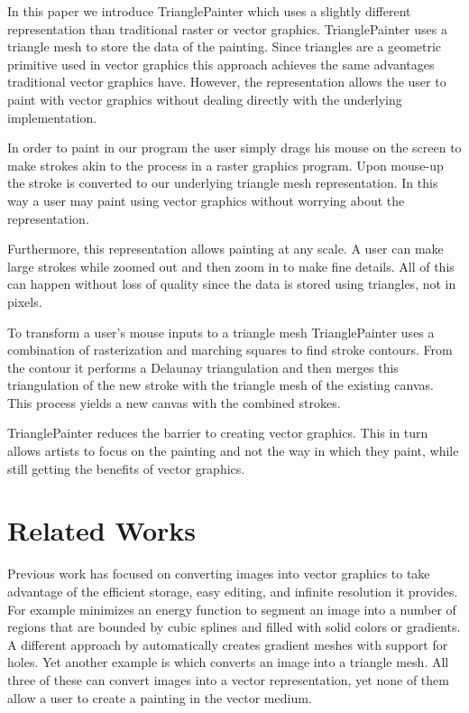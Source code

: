 \documentclass[review]{acmsiggraph}
\begin{document}
In this paper we introduce TrianglePainter which  
uses a slightly different representation than traditional raster or vector graphics.
TrianglePainter uses a triangle mesh to store the data of the painting.
Since triangles are a geometric primitive used in vector graphics this approach achieves the
same advantages traditional vector graphics have. However, the representation allows the
user to paint with vector graphics without dealing directly with the underlying implementation.

In order to paint in our program the user simply drags his mouse on the screen to make
strokes akin to the process in a raster graphics program. Upon mouse-up the stroke is
converted to our underlying triangle mesh representation. In this way a user may paint using
vector graphics without worrying about the representation.

Furthermore, this representation allows painting at any scale. A user can make large strokes
while zoomed out and then zoom in to make fine details. All of this can happen without
loss of quality since the data is stored using triangles, not in pixels.

To transform a user's mouse inputs to a triangle mesh
TrianglePainter uses a combination of rasterization and marching squares to
find stroke contours. From the contour it performs a Delaunay triangulation
and then merges this triangulation
of the new stroke with the triangle mesh of the existing canvas. This process yields
a new canvas with the combined strokes.

TrianglePainter reduces the barrier to creating vector graphics. This in turn allows 
artists to focus on the painting and not the way in which they paint, while still 
getting the benefits of vector graphics.

\section{Related Works}

Previous work has focused on converting images into vector graphics to take advantage of the
efficient storage, easy editing, and infinite resolution it provides. For example \cite{lecot:ARD:2006}
minimizes an energy function to segment an image into a number of regions that are bounded
by cubic splines and filled with solid colors or gradients. A different approach by \cite{Lai:2009:ATG:1531326.1531391} 
automatically creates gradient meshes with support for holes. Yet another example is \cite{10.1109/TVCG.2012.76} 
which converts an image into a triangle mesh. All three of these can convert images into
a vector representation, yet none of them allow a user to create a painting in the vector medium.
\end{document}
